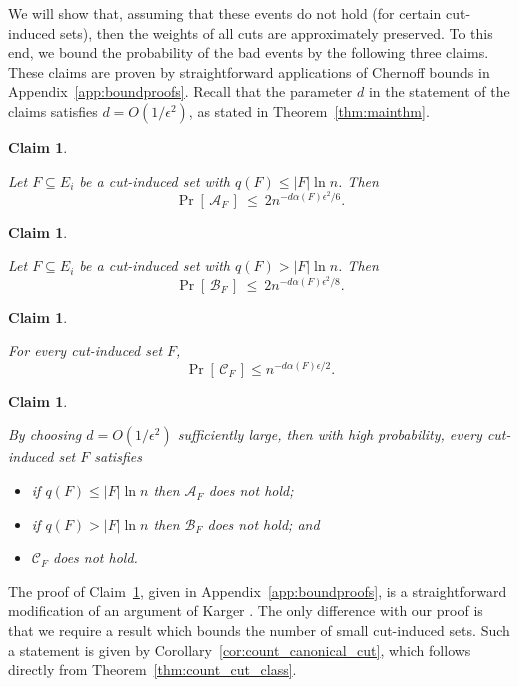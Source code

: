 \documentclass[11pt]{article}
\numberwithin{equation}{section}
\newtheorem{claim}[theorem]{Claim}
\newcommand{\cA}{\mathcal{A}}
\newcommand{\cB}{\mathcal{B}}
\newcommand{\cC}{\mathcal{C}}
\newcommand{\eps}{\epsilon}
\newcommand{\prob}[1]{\operatorname{Pr}\left[\,#1\,\right]}               \newcommand{\probg}[2]{\operatorname{Pr}\left[\,#1 \:\mid\: #2\,\right]}
\newcommand{\Appendix}[1]{Appendix~\ref{app:#1}}
\newcommand{\ClaimName}[1]{\label{clm:#1}}
\newcommand{\Claim}[1]{Claim~\ref{clm:#1}}
\newcommand{\Corollary}[1]{Corollary~\ref{cor:#1}}
\newcommand{\Theorem}[1]{Theorem~\ref{thm:#1}}
\begin{document}
We will show that,
assuming that these events do not hold (for certain cut-induced sets),
then the weights of all cuts are approximately preserved.
To this end, we bound the probability of the bad events
by the following three claims.
These claims are proven by straightforward applications of Chernoff bounds
in \Appendix{boundproofs}.
Recall that the parameter $d$ in the statement of the claims
satisfies $d = O(1/\eps^2)$, as stated in \Theorem{mainthm}.


\newcommand{\clmlargelambda}{
    Let $F \subseteq E_i$ be a cut-induced set with $q(F) \leq |F| \ln n$.
    Then
    $$
        \prob{\cA_F} ~\le~ 2n^{-d\alpha(F)\epsilon^2/6}.
    $$
}
\begin{claim}
\ClaimName{large_lambda}
\clmlargelambda
\end{claim}

\newcommand{\clmsmalllambda}{
    Let $F \subseteq E_i$ be a cut-induced set with $q(F) > |F| \ln n$.
    Then
    $$
        \prob{\cB_F} ~\le~ 2 n^{-d \alpha(F) \epsilon^2 /8}.
    $$
}
\begin{claim}
\ClaimName{small_lambda}
\clmsmalllambda
\end{claim}

\newcommand{\clmerrorub}{
    For every cut-induced set $F$,
    $$
        \prob{ \cC_F } \leq n^{-d \alpha(F) \eps / 2}.
    $$
}
\begin{claim}
\ClaimName{errorub}
\clmerrorub
\end{claim}

\newcommand{\clmunionbound}{
    By choosing $d = O(1/\eps^2)$ sufficiently large,
    then with high probability, every cut-induced set $F$ satisfies
    \begin{itemize}
    \item if $q(F) \leq |F| \ln n$ then $\cA_F$ does not hold;
    \item if $q(F) > |F| \ln n$ then $\cB_F$ does not hold; and
    \item $\cC_F$ does not hold.
    \end{itemize}
}
\begin{claim}
\ClaimName{union_bound}
\clmunionbound
\end{claim}

The proof of \Claim{union_bound}, given in \Appendix{boundproofs},
is a straightforward modification of an argument of Karger \cite{KargerSkel}.
The only difference with our proof is that we require a result which
bounds the number of small cut-induced sets.
Such a statement is given by \Corollary{count_canonical_cut},
which follows directly from \Theorem{count_cut_class}.
\end{document}
